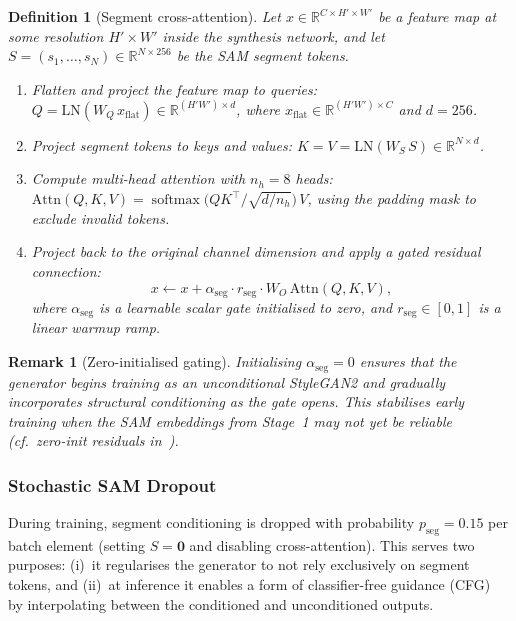 \documentclass[12pt]{article}
\newtheorem{remark}{Remark}
\newtheorem{definition}[theorem]{Definition}
\DeclareMathOperator{\softmax}{softmax}
\begin{document}
\begin{definition}[Segment cross-attention]
\label{def:seg-cross-attn}
Let $x \in \mathbb{R}^{C \times H' \times W'}$ be a feature map at some
resolution $H' \times W'$ inside the synthesis network,
and let $S = (s_1, \ldots, s_N) \in \mathbb{R}^{N \times 256}$
be the SAM segment tokens.
\begin{enumerate}
    \item Flatten and project the feature map to queries:
    $Q = \mathrm{LN}(W_Q\, x_{\mathrm{flat}}) \in \mathbb{R}^{(H'W') \times d}$,
    where $x_{\mathrm{flat}} \in \mathbb{R}^{(H'W') \times C}$ and $d = 256$.
    \item Project segment tokens to keys and values:
    $K = V = \mathrm{LN}(W_S\, S) \in \mathbb{R}^{N \times d}$.
    \item Compute multi-head attention with $n_h = 8$ heads:
    $\mathrm{Attn}(Q, K, V) = \softmax\!\bigl(QK^\top / \sqrt{d/n_h}\bigr)\, V$,
    using the padding mask to exclude invalid tokens.
    \item Project back to the original channel dimension and apply a
    \emph{gated residual connection}:
    \begin{equation}\label{eq:gated-residual}
        x \leftarrow x + \alpha_{\mathrm{seg}} \cdot r_{\mathrm{seg}}
        \cdot W_O\, \mathrm{Attn}(Q, K, V),
    \end{equation}
    where $\alpha_{\mathrm{seg}}$ is a \emph{learnable scalar gate}
    initialised to zero, and $r_{\mathrm{seg}} \in [0,1]$ is a
    linear warmup ramp.
\end{enumerate}
\end{definition}

\begin{remark}[Zero-initialised gating]
\label{rem:zero-gate}
Initialising $\alpha_{\mathrm{seg}} = 0$ ensures that the generator
begins training as an \emph{unconditional} StyleGAN2 and
gradually incorporates structural conditioning as the gate opens.
This stabilises early training when the SAM embeddings from Stage~1
may not yet be reliable
(cf.\ zero-init residuals in~\cite{bachlechner2021rezero,goyal2017accurate}).
\end{remark}

\subsubsection{Stochastic SAM Dropout}

During training, segment conditioning is dropped with probability
$p_{\mathrm{seg}} = 0.15$ per batch element (setting $S = \mathbf{0}$
and disabling cross-attention).
This serves two purposes:
(i)~it regularises the generator to not rely exclusively on segment
tokens, and
(ii)~at inference it enables a form of classifier-free guidance
(CFG)~\cite{ho2022cfg} by interpolating between the conditioned and
unconditioned outputs.
\end{document}
